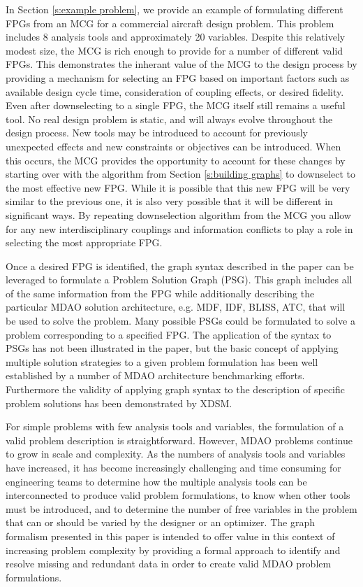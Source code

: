 In Section \ref{s:example problem}, we provide an example of 
formulating different FPGs from an MCG for a commercial aircraft design problem. This problem includes 8 
analysis tools and approximately 20 variables. Despite this relatively modest size, 
the MCG is rich enough to provide for a number of different valid FPGs. This demonstrates
the inherant value of the MCG to the design process by providing a mechanism for selecting 
an FPG based on important factors such as available design cycle time, consideration of 
coupling effects, or desired fidelity. Even after downselecting to a single FPG, the 
MCG itself still remains a useful tool. No real design problem is static, and will always
evolve throughout the design process. New tools may be introduced to account for previously 
unexpected effects and new constraints or objectives can be introduced. When this occurs, 
the MCG provides the opportunity to account for these changes by starting over with the 
algorithm from Section \ref{s:building graphs} to downselect to the most effective new FPG. 
While it is possible that this new FPG will be very similar to the previous one, 
it is also very possible that it will be different in significant ways. 
By repeating downselection algorithm from the MCG you allow for any new interdisciplinary couplings and  
information conflicts to play a role in selecting the most appropriate FPG. 

Once a desired FPG is identified, the graph syntax described in the paper can be 
leveraged to formulate a Problem Solution Graph (PSG). This graph includes all of the 
same information from the FPG while additionally describing the particular MDAO 
solution architecture, e.g. MDF, IDF, BLISS, ATC, that will be used to solve the problem.  
Many possible PSGs could be formulated to solve a problem corresponding to a 
specified FPG. The application of the syntax to PSGs has not been illustrated in the paper, 
but the basic concept of applying multiple solution strategies to a given problem 
formulation has been well established by a number of MDAO architecture 
benchmarking efforts\cite{Tedford2009,gray2013}. Furthermore the validity of applying 
graph syntax to the description of specific problem solutions has been demonstrated 
by XDSM. 

For simple problems with few analysis tools and variables, the formulation of a valid problem description is straightforward.  
However, MDAO problems continue to grow in scale and complexity.  
As the numbers of analysis tools and variables have increased, it has become increasingly challenging and time consuming for engineering teams to determine how the multiple analysis tools can be interconnected to produce valid problem formulations, to know when other tools must be introduced, and to determine the number of free variables in the problem that can or should be varied by the designer or an optimizer.  
The graph formalism presented in this paper is intended to offer value in this context of increasing problem complexity by providing a formal approach to identify and resolve missing and redundant data in order to create valid MDAO problem formulations.  


